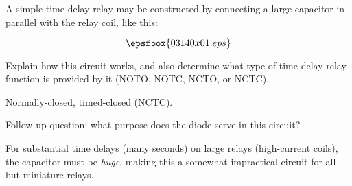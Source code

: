

A simple time-delay relay may be constructed by connecting a large capacitor in parallel with the relay coil, like this:

$$\epsfbox{03140x01.eps}$$

Explain how this circuit works, and also determine what type of time-delay relay function is provided by it (NOTO, NOTC, NCTO, or NCTC).







Normally-closed, timed-closed (NCTC).

\vskip 10pt

Follow-up question: what purpose does the diode serve in this circuit?







For substantial time delays (many seconds) on large relays (high-current coils), the capacitor must be {\it huge}, making this a somewhat impractical circuit for all but miniature relays.  




